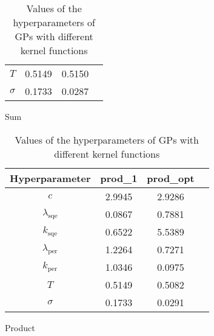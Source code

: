 \begin{table}
\begin{subtable}[t]{0.45\textwidth}
\begin{tabular}[t]{|c|c|c|c|}
            $T$ & 0.5149 & 0.5150 \\
            $\sigma$ & 0.1733 & 0.0287 \\
            \hline
        \end{tabular}
        \caption{Sum}
        \label{table:sum hyperparameters}
    \end{subtable}
    \begin{subtable}[t]{0.45\textwidth}
        \centering
        \begin{tabular}[t]{|c|c|c|c|}
            \hline
            Hyperparameter & prod\_1 & prod\_opt \\
            \hline
            $c$ & 2.9945 & 2.9286 \\
            $\lambda_{\text{sqe}}$ & 0.0867 & 0.7881 \\
            $k_{\text{sqe}}$ & 0.6522 & 5.5389 \\
            $\lambda_{\text{per}}$ & 1.2264 & 0.7271 \\
            $k_{\text{per}}$ & 1.0346 & 0.0975 \\
            $T$ & 0.5149 & 0.5082 \\
            $\sigma$ & 0.1733 & 0.0291 \\
            \hline
        \end{tabular}
        \caption{Product}
        \label{table:prod hyperparameters}
    \end{subtable}
    \caption{Values of the hyperparameters of GPs with different kernel functions}
    \label{table:hyperparameters}
\end{table}
